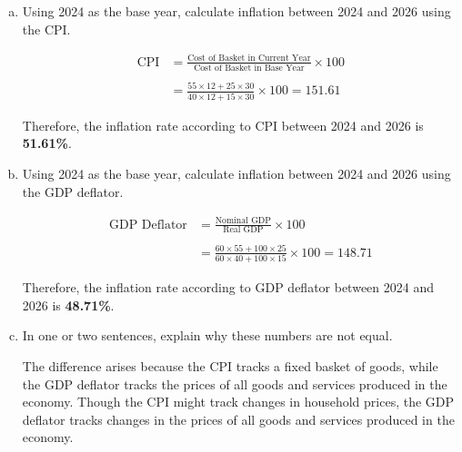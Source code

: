 \documentclass{article}
\begin{document}
\begin{enumerate}[(a)]
    \item Using 2024 as the base year, calculate inflation between 2024 and 2026 using the CPI.
    
    \begin{align*}
        \text{CPI} &= \frac{\text{Cost of Basket in Current Year}}{\text{Cost of Basket in Base Year}} \times 100\\\\
        &= \frac{55 \times 12 + 25 \times 30}{40 \times 12 + 15 \times 30} \times 100 = 151.61
    \end{align*}

    Therefore, the inflation rate according to CPI between 2024 and 2026 is \textbf{51.61\%}.

    \item Using 2024 as the base year, calculate inflation between 2024 and 2026 using the GDP deflator.
    
    \begin{align*}
        \text{GDP Deflator} &= \frac{\text{Nominal GDP}}{\text{Real GDP}} \times 100\\\\
        &= \frac{60 \times 55 + 100 \times 25}{60 \times 40 + 100 \times 15} \times 100 = 148.71
    \end{align*}

    Therefore, the inflation rate according to GDP deflator between 2024 and 2026 is \textbf{48.71\%}.

    \item In one or two sentences, explain why these numbers are not equal.
    
    The difference arises because the CPI tracks a fixed basket of goods, while the GDP deflator tracks the prices of all goods and services produced in the economy. Though the CPI might track changes in household prices, the GDP deflator tracks changes in the prices of all goods and services produced in the economy.

\end{enumerate}
\end{document}
